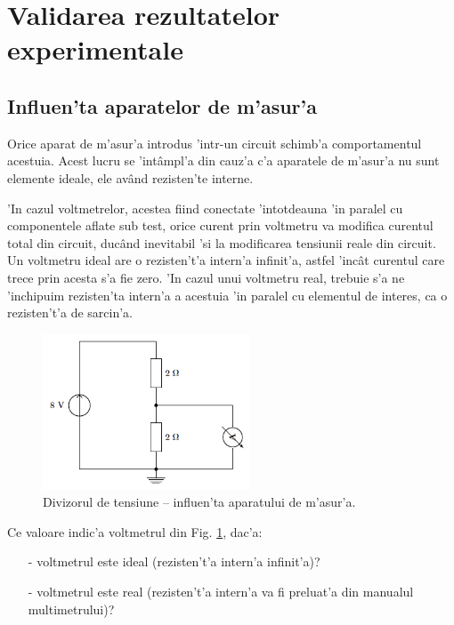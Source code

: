 \section{Validarea rezultatelor experimentale}

\subsection*{Influen'ta aparatelor de m'asur'a}

Orice aparat de m'asur'a introdus 'intr-un circuit schimb'a comportamentul acestuia. Acest lucru se 'int\^ampl'a din cauz'a c'a aparatele de m'asur'a nu sunt elemente ideale, ele av\^and rezisten'te interne.

'In cazul voltmetrelor, acestea fiind conectate 'intotdeauna 'in paralel cu componentele aflate sub test, orice curent prin voltmetru va modifica curentul total din circuit, duc\^and inevitabil 'si la modificarea tensiunii reale din circuit. Un voltmetru ideal are o rezisten't'a intern'a infinit'a, astfel 'inc\^at curentul care trece prin acesta s'a fie zero. 'In cazul unui voltmetru real, trebuie s'a ne 'inchipuim rezisten'ta intern'a a acestuia 'in paralel cu elementul de interes, ca o rezisten't'a de sarcin'a.
\begin{figure}[!b]
	\centering
		\includegraphics[width=0.55\textwidth]{laborator_01/figuri/5_divizor_cu_voltmetru}
	\caption{Divizorul de tensiune -- influen'ta aparatului de m'asur'a.}
	\label{fig:divizor_cu_voltmetru}
\end{figure}

\begin{exercise}
Ce valoare indic'a voltmetrul din Fig. \ref{fig:divizor_cu_voltmetru}, dac'a:
\begin{itemize}
\item[-] voltmetrul este ideal (rezisten't'a intern'a infinit'a)?
\item[-] voltmetrul este real (rezisten't'a intern'a va fi preluat'a din manualul multimetrului)? %
\end{itemize}
\end{exercise}


